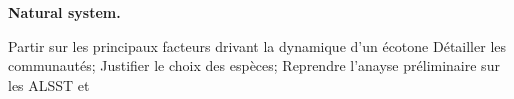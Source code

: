 
\textbf{Natural system.}  

Partir sur les principaux facteurs drivant la dynamique d'un écotone
Détailler les communautés;
Justifier le choix des espèces; 
Reprendre l'anayse préliminaire sur les ALSST et 




